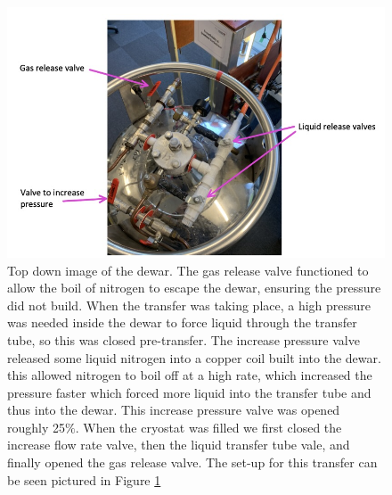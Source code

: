\documentclass[a4paper,11pt]{article}
\begin{document}
   \begin{figure}[hbt!]
       \centering
       \includegraphics[scale=0.7]{Picture 3.jpeg}
       \caption{Top down image of the dewar. The gas release valve functioned to allow the boil of nitrogen to escape the dewar, ensuring the pressure did not build. When the transfer was taking place, a high pressure was needed inside the dewar to force liquid through the transfer tube, so this was closed pre-transfer. The increase pressure valve released some liquid nitrogen into a copper coil built into the dewar. this allowed nitrogen to boil off at a high rate, which increased the pressure faster which forced more liquid into the transfer tube and thus into the dewar. This increase pressure valve was opened roughly 25$\%$. When the cryostat was filled we first closed the increase flow rate valve, then the liquid transfer tube vale, and finally opened the gas release valve. The set-up for this transfer can be seen pictured in Figure \ref{fig:Liquid Nitrogen set-up}}
       \label{fig:Liquid Nitrogen set-up}
   \end{figure}
   \\
   
\end{document}
